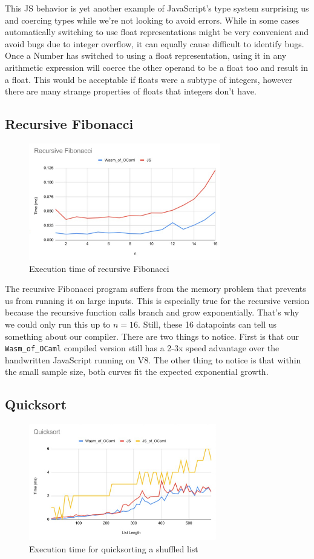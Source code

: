 \documentclass[12pt,a4paper,twoside,openright]{report}
\begin{document}
This JS behavior is yet another example of JavaScript's type system surprising us and coercing types while we're not looking to avoid errors.
While in some cases automatically switching to use float representations might be very convenient and avoid bugs due to integer overflow, it can equally cause difficult to identify bugs.
Once a Number has switched to using a float representation, using it in any arithmetic expression will coerce the other operand to be a float too and result in a float.
This would be acceptable if floats were a subtype of integers, however there are many strange properties of floats that integers don't have.

\subsection{Recursive Fibonacci}
\begin{figure}[tbh]
\centerline{\includegraphics[height=2in]{fib-rec-graph}}
\caption{Execution time of recursive Fibonacci}
\label{fib-rec-graph}
\end{figure}
The recursive Fibonacci program suffers from the memory problem that prevents us from running it on large inputs.
This is especially true for the recursive version because the recursive function calls branch and grow exponentially.
That's why we could only run this up to $n=16$.
Still, these 16 datapoints can tell us something about our compiler.
There are two things to notice.
First is that our {\tt Wasm\_of\_OCaml} compiled version still has a 2-3x speed advantage over the handwritten JavaScript running on V8.
The other thing to notice is that within the small sample size, both curves fit the expected exponential growth.

\subsection{Quicksort}
\begin{figure}[tbh]
\centerline{\includegraphics[height=2in]{quicksort-graph}}
\caption{Execution time for quicksorting a shuffled list}
\label{quicksort-graph}
\end{figure}
\end{document}
